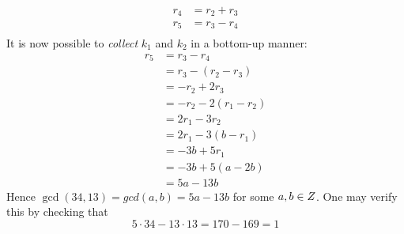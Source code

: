 \begin{remark}
\begin{equation}
\begin{aligned}
                r_4         &= r_2 + r_3 \\
                \boxed{r_5} &= r_3 - r_4 \\
                \phantom{}  &\phantom{}
            \end{aligned}
        \end{equation}
        It is now possible to \textit{collect} $k_1$ and $k_2$ in a bottom-up manner:
        \begin{align}
            \boxed{r_5} &= r_3 - r_4 \\
                        &= r_3 - (r_2 - r_3) \\
                        &= -r_2 + 2r_3 \\
                        &= -r_2 - 2(r_1 - r_2) \\
                        &= 2r_1 - 3r_2 \\
                        &= 2r_1 - 3(b - r_1) \\
                        &= -3b + 5r_1 \\
                        &= -3b + 5(a - 2b) \\
                        &= 5a - 13b
        \end{align}
        Hence $\gcd(34, 13) = gcd(a, b) = 5a - 13b$ for some $a, b \in \relax{Z}$. One may verify this by checking that
        \begin{equation}
            5 \cdot 34 - 13 \cdot 13 = 170 - 169 = 1
        \end{equation}
\end{remark}
